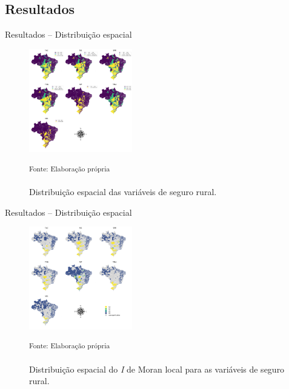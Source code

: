 \documentclass[aspectratio=169]{beamer}
\begin{document}
\subsection{Resultados}

\begin{frame}{Resultados -- Distribuição espacial}
    \begin{figure}[h]
    	\centering
    	\includegraphics[width=0.4\textwidth]{img/map_variaveis.png}
    	\caption{Distribuição espacial das variáveis de seguro rural.}
    	\noindent \small \textsuperscript{Fonte: Elaboração própria}
    	\label{mapa_variaveis}
    \end{figure}
\end{frame}

\begin{frame}{Resultados -- Distribuição espacial}
    \begin{figure}[h]
    	\centering
    	\includegraphics[width=0.4\textwidth]{img/map_i_moran_variaveis.png}
    	\caption{Distribuição espacial do \textit{I} de Moran local para as variáveis de seguro rural.}
    	\noindent \small \textsuperscript{Fonte: Elaboração própria}
    	\label{lisa_variaveis}
    \end{figure}
\end{frame}
\end{document}
